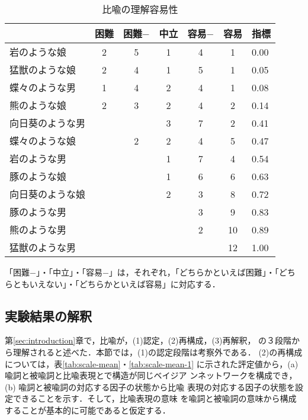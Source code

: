 \begin{table}[htbp]
   \begin{center}
      \leavevmode
      \begin{tabular}{|l|ccccc|l|}\hline
                 & 困難 & 困難$-$ & 中立 & 容易$-$ & 容易 & 指標\\ \hline
    岩のような娘 &    2 &     5 &    1 &     4 &    1 & 0.00\\
  猛獣のような娘 &    2 &     4 &    1 &     5 &    1 & 0.05\\
  蝶々のような男 &    1 &     4 &    2 &     4 &    1 & 0.08\\
    熊のような娘 &    2 &     3 &    2 &     4 &    2 & 0.14\\
向日葵のような男 &      &       &    3 &     7 &    2 & 0.41\\
  蝶々のような娘 &      &     2 &    2 &     4 &    5 & 0.47\\
    岩のような男 &      &       &    1 &     7 &    4 & 0.54\\
    豚のような娘 &      &       &    1 &     6 &    6 & 0.63\\
向日葵のような娘 &      &       &    2 &     3 &    8 & 0.72\\
    豚のような男 &      &       &      &     3 &    9 & 0.83\\
    熊のような男 &      &       &      &     2 &   10 & 0.89\\
  猛獣のような男 &      &       &      &       &   12 & 1.00\\ \hline
       \end{tabular}

       \vspace{\baselineskip}

       \begin{minipage}{11cm}
         「困難$-$」・「中立」・「容易$-$」は，それぞれ，「どちらかといえば困難」・「どちらともいえない」・「どちらかといえば容易」に対応する．
       \end{minipage}

   \end{center}
   \caption{比喩の理解容易性}
   \label{tab:easiness}
\end{table}

\subsection{実験結果の解釈}
\label{sec:interpretation}
第\ref{sec:introduction}章で，比喩が，(1)認定，(2)再構成，(3)再解釈，
の３段階から理解されると述べた．本節では，(1)の認定段階は考察外である．
(2)の再構成については，表\ref{tab:scale-mean}・\ref{tab:scale-mean-1}
に示された評定値から，(a)喩詞と被喩詞と比喩表現とで構造が同じベイジア
ンネットワークを構成でき，(b) 喩詞と被喩詞の対応する因子の状態から比喩
表現の対応する因子の状態を設定できることを示す．そして，比喩表現の意味
を喩詞と被喩詞の意味から構成することが基本的に可能であると仮定する．

